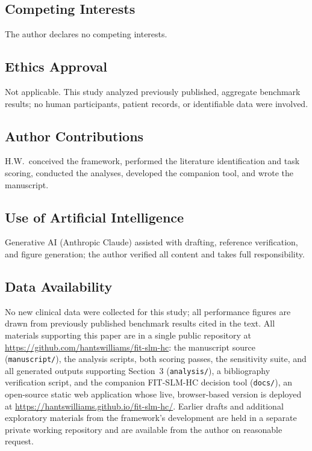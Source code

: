 \documentclass[11pt]{article}
\begin{document}
\subsection*{Competing Interests}
The author declares no competing interests.

\subsection*{Ethics Approval}
Not applicable. This study analyzed previously published, aggregate benchmark results; no human participants, patient records, or identifiable data were involved.

\subsection*{Author Contributions}
H.W.\ conceived the framework, performed the literature identification and task scoring, conducted the analyses, developed the companion tool, and wrote the manuscript.

\subsection*{Use of Artificial Intelligence}
Generative AI (Anthropic Claude) assisted with drafting, reference verification, and figure generation; the author verified all content and takes full responsibility.

\subsection*{Data Availability}
No new clinical data were collected for this study; all performance figures are drawn from previously published benchmark results cited in the text. All materials supporting this paper are in a single public repository at \url{https://github.com/hantswilliams/fit-slm-hc}: the manuscript source (\texttt{manuscript/}), the analysis scripts, both scoring passes, the sensitivity suite, and all generated outputs supporting Section~3 (\texttt{analysis/}), a bibliography verification script, and the companion FIT-SLM-HC decision tool (\texttt{docs/}), an open-source static web application whose live, browser-based version is deployed at \url{https://hantswilliams.github.io/fit-slm-hc/}. Earlier drafts and additional exploratory materials from the framework's development are held in a separate private working repository and are available from the author on reasonable request.
\end{document}
